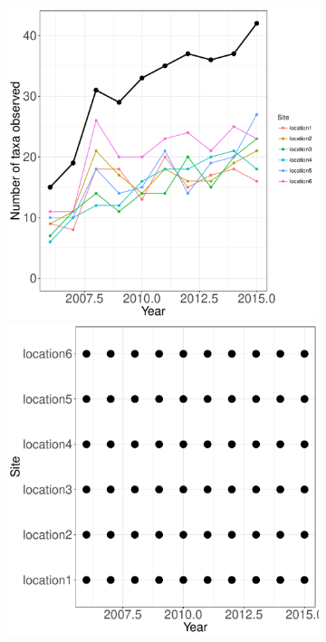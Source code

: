 \documentclass[11pt, oneside]{article}
\begin{document}
\begin{figure}[h!]
\begin{figure}[h!]
\includegraphics[scale = 0.4]{mcr-algae-castorani_num_taxa_over_time.pdf}
\includegraphics[scale = 0.4]{mcr-algae-castorani_spatiotemporal_sampling_effort.pdf}

\end{figure}
\end{figure}
\end{document}
